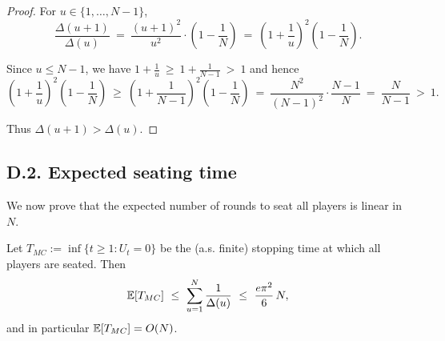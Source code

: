\begin{proof}
For $u\in\{1,\dots,N-1\}$,
\[
\frac{\Delta(u+1)}{\Delta(u)}
\ =\ \frac{(u+1)^2}{u^2}\cdot \left(1-\frac{1}{N}\right)
\ =\ \left(1+\frac{1}{u}\right)^2\left(1-\frac{1}{N}\right).
\]

Since $u\le N-1$, we have $1+\frac{1}{u}\ \ge\ 1+\frac{1}{N-1}\ >\ 1$ and hence
\[
\left(1+\frac{1}{u}\right)^2\left(1-\frac{1}{N}\right)
\ \ge\ \left(1+\frac{1}{N-1}\right)^2\left(1-\frac{1}{N}\right)
\ =\ \frac{N^2}{(N-1)^2}\cdot \frac{N-1}{N}
\ =\ \frac{N}{N-1}\ >\ 1.
\]

Thus $\Delta(u+1)>\Delta(u)$.
\end{proof}

\subsection*{D.2.\; Expected seating time}

We now prove that the expected number of rounds to seat all players is linear in $N$.

\begin{theorem}
\label{thm:mc-time-app}
Let $T_{MC}:=\inf\{t\ge 1: U_t=0\}$ be the (a.s. finite) stopping time at which all players are seated.
Then
\[
\EE[T_{MC}]\ \le\ \sum_{u=1}^{N}\frac{1}{\Delta(u)}\ \le\ \frac{e\pi^2}{6}\,N,
\]
and in particular $\mathbb{E}[T_{MC}]=O(N)$.
\end{theorem}

